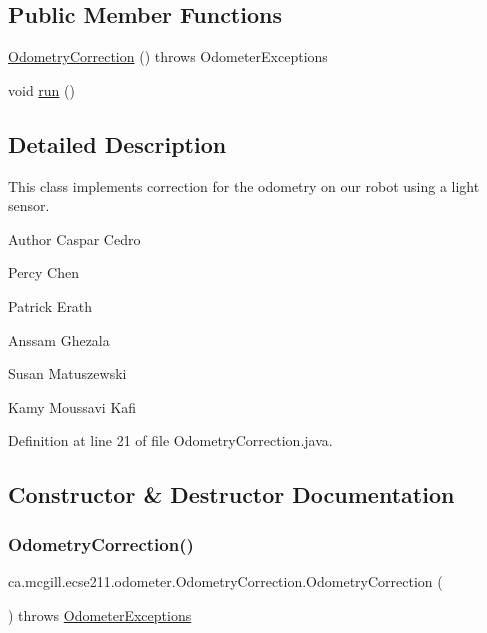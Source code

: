 \subsection*{Public Member Functions}
\begin{DoxyCompactItemize}
\item 
\hyperlink{classca_1_1mcgill_1_1ecse211_1_1odometer_1_1_odometry_correction_ad80b45e0bc4bf935494e075edcec739c}{Odometry\+Correction} ()  throws Odometer\+Exceptions 
\item 
void \hyperlink{classca_1_1mcgill_1_1ecse211_1_1odometer_1_1_odometry_correction_aad66a7030ac00f3a9cbe7bc33c25acbf}{run} ()
\end{DoxyCompactItemize}


\subsection{Detailed Description}
This class implements correction for the odometry on our robot using a light sensor.

\begin{DoxyAuthor}{Author}
Caspar Cedro 

Percy Chen 

Patrick Erath 

Anssam Ghezala 

Susan Matuszewski 

Kamy Moussavi Kafi 
\end{DoxyAuthor}


Definition at line 21 of file Odometry\+Correction.\+java.



\subsection{Constructor \& Destructor Documentation}
\mbox{\label{classca_1_1mcgill_1_1ecse211_1_1odometer_1_1_odometry_correction_ad80b45e0bc4bf935494e075edcec739c}} 
\subsubsection{\texorpdfstring{Odometry\+Correction()}{OdometryCorrection()}}
{\footnotesize\ttfamily ca.\+mcgill.\+ecse211.\+odometer.\+Odometry\+Correction.\+Odometry\+Correction (\begin{DoxyParamCaption}{ }\end{DoxyParamCaption}) throws \hyperlink{classca_1_1mcgill_1_1ecse211_1_1odometer_1_1_odometer_exceptions}{Odometer\+Exceptions}}

